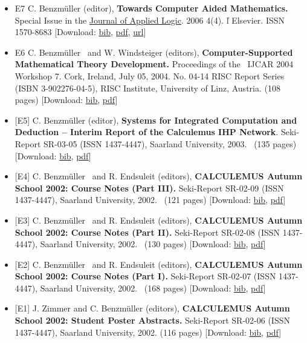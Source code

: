\documentclass{article}
\newcommand{\tmtextbf}[1]{{\bfseries{#1}}}
\newenvironment{itemizedot}{\begin{itemize} \renewcommand{\labelitemi}{$\bullet$}\renewcommand{\labelitemii}{$\bullet$}\renewcommand{\labelitemiii}{$\bullet$}\renewcommand{\labelitemiv}{$\bullet$}}{\end{itemize}}
\begin{document}
\begin{itemizedot}
  \item [E7] C. Benzm\"uller (editor), \tmtextbf{Towards Computer Aided
  Mathematics.} Special Issue in the
  \href{http://www.elsevier.com/wps/find/journaldescription.cws\_home/672712/description\#description}{Journal
  of Applied Logic}. 2006 4(4).  \v{l}  Elsevier. ISSN 1570-8683 {\color{grey}
  [Download: {\small \href{../papers/E7.bib}{bib}}, {\small
  \href{http://www.sciencedirect.com/science/journal/15708683}{}\href{../papers/E7.pdf}{pdf}},
  \href{http://www.sciencedirect.com/science/journal/15708683/4/4}{url}]}
  
  \item [E6] {\small C. Benzm\"uller \ and W. Windsteiger (editors), } {\small
  \tmtextbf{Computer-Supported Mathematical Theory Development.} Proceedings
  of the \ IJCAR 2004 Workshop 7. Cork, Ireland, July 05, 2004. No. 04-14 RISC
  Report Series (ISBN 3-902276-04-5), RISC Institute, University of Linz,
  Austria. (108 pages)} {\color{grey} [Download: {\small
  \href{../papers/E6.bib}{bib}, \href{../papers/E6.pdf}{pdf}}]}
  
  \item {\small [E5] C. Benzm\"uller (editor), \tmtextbf{Systems for
  Integrated Computation and Deduction -- Interim Report of the Calculemus IHP
  Network}.} {\small Seki-Report SR-03-05 (ISSN 1437-4447), Saarland
  University, 2003. \ (135 pages)} {\color{grey} [Download: {\small
  \href{../papers/E5.bib}{bib}, \href{../papers/MTR-report-long.pdf}{pdf}}]}
  
  \item {\small [E4] C. Benzm\"uller \ and R. Endsuleit (editors),
  \tmtextbf{CALCULEMUS Autumn School 2002: Course Notes (Part III).}} {\small
  Seki-Report SR-02-09 (ISSN 1437-4447), Saarland University, 2002. \ (121
  pages)} {\color{grey} [Download: {\small \href{../papers/E4.bib}{bib},
  \href{../papers/E4.pdf}{pdf}}]}
  
  \item {\small [E3] C. Benzm\"uller \ and R. Endsuleit (editors),
  \tmtextbf{CALCULEMUS Autumn School 2002: Course Notes (Part II).} } {\small
  Seki-Report SR-02-08 (ISSN 1437-4447), Saarland University, 2002. \ (130
  pages)} {\color{grey} [Download: {\small \href{../papers/E3.bib}{bib},
  \href{../papers/E3.pdf}{pdf}}]}
  
  \item {\small [E2] C. Benzm\"uller \ and R. Endsuleit (editors),
  \tmtextbf{CALCULEMUS Autumn School 2002: Course Notes (Part I).} } {\small
  Seki-Report SR-02-07 (ISSN 1437-4447), Saarland University, 2002. \ (168
  pages)} {\color{grey} [Download: {\small \href{../papers/E2.bib}{bib},
  \href{../papers/E2.pdf}{pdf}}]}
  
  \item {\small [E1] J. Zimmer and C. Benzm\"uller (editors),
  \tmtextbf{CALCULEMUS Autumn School 2002: Student Poster Abstracts.}
  Seki-Report SR-02-06 (ISSN 1437-4447), Saarland University, 2002. (116
  pages)} {\color{grey} [Download: {\small \href{../papers/E1.bib}{bib},
  \href{../papers/E1.pdf}{pdf}}]}
\end{itemizedot}
\end{document}
